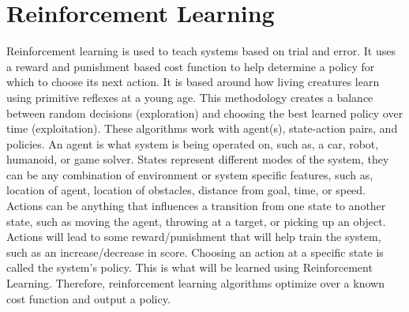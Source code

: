 \documentclass[12pt,american]{report}
\begin{document}
\section{Reinforcement Learning}
Reinforcement learning is used to teach systems based on trial and error.  It uses a reward and punishment based cost function to help determine a policy for which to choose its next action.  It is based around how living creatures learn using primitive reflexes at a young age. This methodology creates a balance between random decisions (exploration) and choosing the best learned policy over time (exploitation). These algorithms work with agent(s), state-action pairs, and policies. An agent is what system is being operated on, such as, a car, robot, humanoid, or game solver. States represent different modes of the system, they can be any combination of environment or system specific features, such as, location of agent, location of obstacles, distance from goal, time, or speed. Actions can be anything that influences a transition from one state to another state, such as moving the agent, throwing at a target, or picking up an object.  Actions will lead to some reward/punishment that will help train the system, such as an increase/decrease in score.  Choosing an action at a specific state is called the system's policy. This is what will be learned using Reinforcement Learning.  Therefore, reinforcement learning algorithms optimize over a known cost function and output a policy.
\end{document}
